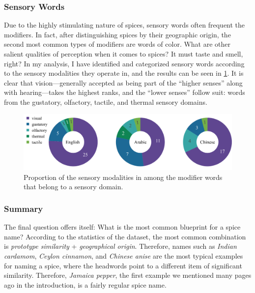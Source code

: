 \subsubsection{Sensory Words}

Due to the highly stimulating nature of spices, sensory words often frequent the modifiers. In fact, after distinguishing spices by their geographic origin, the second most common types of modifiers are words of color. What are other salient qualities of perception when it comes to spices? It must taste and smell, right? In my analysis, I have identified and categorized sensory words according to the sensory modalities they operate in, and the results can be seen in \cref{fig:sensory_tripie}. It is clear that vision---generally accepted as being part of the ``higher senses'' along with hearing---takes the highest ranks, and the ``lower senses'' follow suit: words from the gustatory, olfactory, tactile, and thermal sensory domains. 



\begin{figure}[ht!]
  \includegraphics[width=\linewidth]{imgs/plots/sensory_tripie.pdf}
  \caption[Proportion of the sensory modalities in among the modifiers.]{Proportion of the sensory modalities in among the modifier words that belong to a sensory domain.}
  \label{fig:sensory_tripie}
\end{figure}




\subsubsection{Summary}

The final question offers itself: What is the most common blueprint for a spice name? According to the statistics of the dataset, the most common combination is \textit{prototype similarity} + \textit{geographical origin}. Therefore, names such as \textit{Indian cardamom}, \textit{Ceylon cinnamon}, and \textit{Chinese anise} are the most typical examples for naming a spice, where the headwords point to a different item of significant similarity. Therefore, \textit{Jamaica pepper}, the first example we mentioned many pages ago in the introduction, is a fairly regular spice name.





